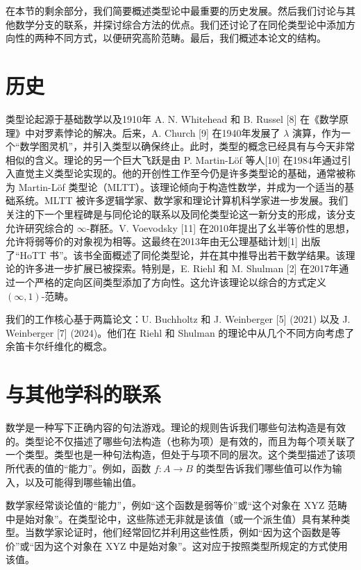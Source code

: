\documentclass{ctexrep}
\theoremstyle{plain}
\theoremstyle{definition}
\theoremstyle{remark}
\theoremstyle{definition}
\theoremstyle{definition}
\theoremstyle{definition}
\begin{document}
在本节的剩余部分，我们简要概述类型论中最重要的历史发展。然后我们讨论与其他数学分支的联系，并探讨综合方法的优点。我们还讨论了在同伦类型论中添加方向性的两种不同方式，以便研究高阶范畴。最后，我们概述本论文的结构。

\section{历史}

类型论起源于基础数学以及1910年 A. N. Whitehead 和 B. Russel [8] 在《数学原理》中对罗素悖论的解决。后来，A. Church [9] 在1940年发展了 $\lambda$ 演算，作为一个“数学图灵机”，并引入类型以确保终止。此时，类型的概念已经具有与今天非常相似的含义。理论的另一个巨大飞跃是由 P. Martin-Löf 等人[10] 在1984年通过引入直觉主义类型论实现的。他的开创性工作至今仍是许多类型论的基础，通常被称为 Martin-Löf 类型论（MLTT）。该理论倾向于构造性数学，并成为一个适当的基础系统。MLTT 被许多逻辑学家、数学家和理论计算机科学家进一步发展。我们关注的下一个里程碑是与同伦论的联系以及同伦类型论这一新分支的形成，该分支允许研究综合的 $\infty$-群胚。V. Voevodsky [11] 在2010年提出了幺半等价性的思想，允许将弱等价的对象视为相等。这最终在2013年由无公理基础计划[1] 出版了“HoTT 书”。该书全面概述了同伦类型论，并在其中推导出若干数学结果。该理论的许多进一步扩展已被探索。特别是，E. Riehl 和 M. Shulman [2] 在2017年通过一个严格的定向区间类型添加了方向性。这允许该理论以综合的方式定义 $(\infty,1)$-范畴。

我们的工作核心基于两篇论文：U. Buchholtz 和 J. Weinberger [5] (2021) 以及 J. Weinberger [7] (2024)。他们在 Riehl 和 Shulman 的理论中从几个不同方向考虑了余笛卡尔纤维化的概念。

\section{与其他学科的联系}

数学是一种写下正确内容的句法游戏。理论的规则告诉我们哪些句法构造是有效的。类型论不仅描述了哪些句法构造（也称为项）是有效的，而且为每个项关联了一个类型。类型也是一种句法构造，但处于与项不同的层次。这个类型描述了该项所代表的值的“能力”。例如，函数 $f:A\to B$ 的类型告诉我们哪些值可以作为输入，以及可能得到哪些输出值。

数学家经常谈论值的“能力”，例如“这个函数是弱等价”或“这个对象在 XYZ 范畴中是始对象”。在类型论中，这些陈述无非就是该值（或一个派生值）具有某种类型。当数学家论证时，他们经常回忆并利用这些性质，例如“因为这个函数是等价”或“因为这个对象在 XYZ 中是始对象”。这对应于按照类型所规定的方式使用该值。
\end{document}
